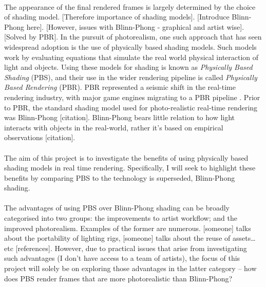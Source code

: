 \paragraph{}The appearance of the final rendered frames is largely determined by the choice of shading model. [Therefore importance of shading models]. [Introduce Blinn-Phong here]. [However, issues with Blinn-Phong - graphical and artist wise\textbf{}]. [Solved by PBR]. In the pursuit of photorealism, one such approach that has seen widespread adoption is the use of physically based shading models. Such models work by evaluating equations that simulate the real world physical interaction of light and objects. Using these models for shading is known as \textit{Physically Based Shading} (PBS), and their use in the wider rendering pipeline is called \textit{Physically Based Rendering} (PBR). PBR represented a seismic shift in the real-time rendering industry, with major game engines migrating to a PBR pipeline \cite{movingFrostbitetoPBR} \cite{RealShadingInUnreal}. Prior to PBR, the standard shading model used for photo-realistic real-time rendering was Blinn-Phong [citation]. Blinn-Phong bears little relation to how light interacts with objects in the real-world, rather it’s based on empirical observations [citation].

\paragraph{}The aim of this project is to investigate the benefits of using physically based shading models in real time rendering. Specifically, I will seek to highlight these benefits by comparing PBS to the technology is superseded, Blinn-Phong shading.

\paragraph{}The advantages of using PBS over Blinn-Phong shading can be broadly categorised into two groups: the improvements to artist workflow; and the improved photorealism. Examples of the former are numerous. [someone] talks about the portability of lighting rigs, [someone] talks about the reuse of assets… etc [references]. However, due to practical issues that arise from investigating such advantages (I don’t have access to a team of artists), the focus of this project will solely be on exploring those advantages in the latter category – how does PBS render frames that are more photorealistic than Blinn-Phong?

